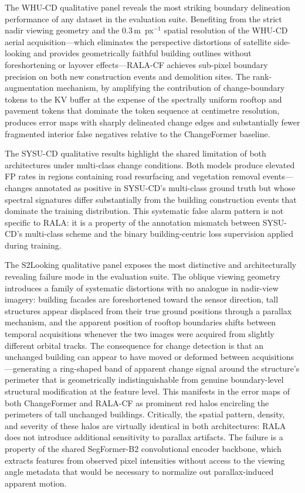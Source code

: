 The WHU-CD qualitative panel reveals the most striking boundary delineation
performance of any dataset in the evaluation suite. Benefiting from the strict
nadir viewing geometry and the $0.3\,\mathrm{m}$~px$^{-1}$ spatial resolution of
the WHU-CD aerial acquisition---which eliminates the perspective distortions of
satellite side-looking and provides geometrically faithful building outlines
without foreshortening or layover effects---\ac{RALA-CF} achieves sub-pixel
boundary precision on both new construction events and demolition sites. The
rank-augmentation mechanism, by amplifying the contribution of change-boundary
tokens to the \ac{KV} buffer at the expense of the spectrally uniform rooftop
and pavement tokens that dominate the token sequence at centimetre resolution,
produces error maps with sharply delineated change edges and substantially fewer
fragmented interior false negatives relative to the ChangeFormer baseline.

The SYSU-CD qualitative results highlight the shared limitation of both
architectures under multi-class change conditions. Both models produce elevated
\ac{FP} rates in regions containing road resurfacing and vegetation removal
events---changes annotated as positive in SYSU-CD's multi-class ground truth but
whose spectral signatures differ substantially from the building construction
events that dominate the training distribution. This systematic false alarm pattern
is not specific to \ac{RALA}: it is a property of the annotation mismatch between
SYSU-CD's multi-class scheme and the binary building-centric loss supervision
applied during training.

The S2Looking qualitative panel exposes the most distinctive and architecturally
revealing failure mode in the evaluation suite. The oblique viewing geometry
introduces a family of systematic distortions with no analogue in nadir-view
imagery: building facades are foreshortened toward the sensor direction, tall
structures appear displaced from their true ground positions through a parallax
mechanism, and the apparent position of rooftop boundaries shifts between temporal
acquisitions whenever the two images were acquired from slightly different orbital
tracks. The consequence for change detection is that an unchanged building can
appear to have moved or deformed between acquisitions---generating a ring-shaped
band of apparent change signal around the structure's perimeter that is
geometrically indistinguishable from genuine boundary-level structural modification
at the feature level. This manifests in the error maps of both ChangeFormer and
\ac{RALA-CF} as prominent red halos encircling the perimeters of tall unchanged
buildings. Critically, the spatial pattern, density, and severity of these halos
are virtually identical in both architectures: \ac{RALA} does not introduce
additional sensitivity to parallax artifacts. The failure is a property of the
shared SegFormer-B2 convolutional encoder backbone, which extracts features from
observed pixel intensities without access to the viewing angle metadata that would
be necessary to normalize out parallax-induced apparent motion.


